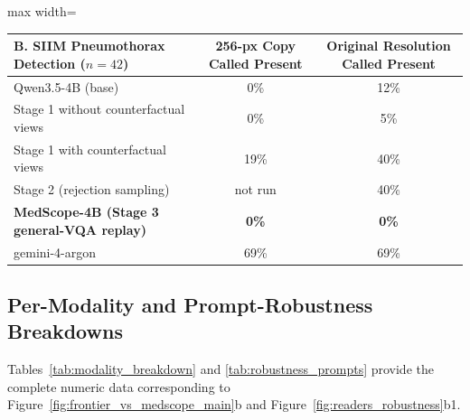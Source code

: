 \documentclass[10pt]{article}
\begin{document}
\begin{table}[!htbp]
\begin{center}
\vspace{0.2cm}
\begin{adjustbox}{max width=\linewidth}
\begin{tabular}{lcc}
\toprule
\textbf{B. SIIM Pneumothorax Detection ($n=42$)} & \textbf{256-px Copy Called Present} & \textbf{Original Resolution Called Present} \\
\midrule
Qwen3.5-4B (base) & 0\% & 12\% \\
Stage 1 without counterfactual views & 0\% & 5\% \\
Stage 1 with counterfactual views & 19\% & 40\% \\
Stage 2 (rejection sampling) & not run & 40\% \\
\textbf{MedScope-4B (Stage 3 general-VQA replay)} & \textbf{0\%} & \textbf{0\%} \\
gemini-4-argon & 69\% & 69\% \\
\bottomrule
\end{tabular}
\end{adjustbox}
\end{center}
\end{table}

\subsection{Per-Modality and Prompt-Robustness Breakdowns}
Tables~\ref{tab:modality_breakdown} and \ref{tab:robustness_prompts} provide the complete numeric data corresponding to Figure~\ref{fig:frontier_vs_medscope_main}b and Figure~\ref{fig:readers_robustness}b1.
\end{document}
